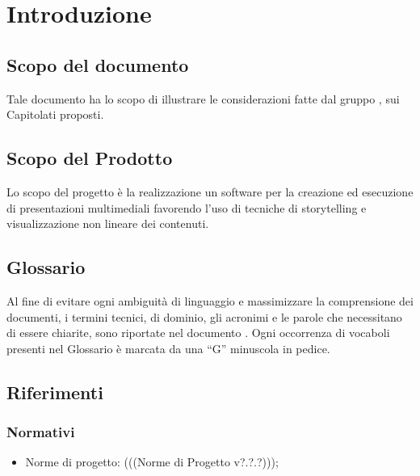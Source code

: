 \section{Introduzione}{
	\subsection{Scopo del documento}{
		Tale documento ha lo scopo di illustrare le considerazioni fatte dal gruppo \gruppo, sui Capitolati proposti.
	}
	\subsection{Scopo del Prodotto}{
		Lo scopo del progetto è la realizzazione un software per la creazione ed esecuzione di presentazioni multimediali favorendo l’uso di tecniche di storytelling e visualizzazione non lineare dei contenuti.
		}
	\subsection{Glossario}{
		Al fine di evitare ogni ambiguità di linguaggio e massimizzare la comprensione dei documenti, i termini tecnici, di dominio, gli acronimi e le parole che necessitano di essere chiarite, sono riportate nel documento \href{run:../../Esterni/\fGlossario}{\fEscapeGlossario}. Ogni occorrenza di vocaboli presenti nel Glossario è marcata da una “G” minuscola in pedice.
		}
	\subsection{Riferimenti}{
		\subsubsection{Normativi}{
			\begin{itemize}
				\item Norme di progetto: (((Norme di Progetto v?.?.?)));
			\end{itemize}
			}
}}
